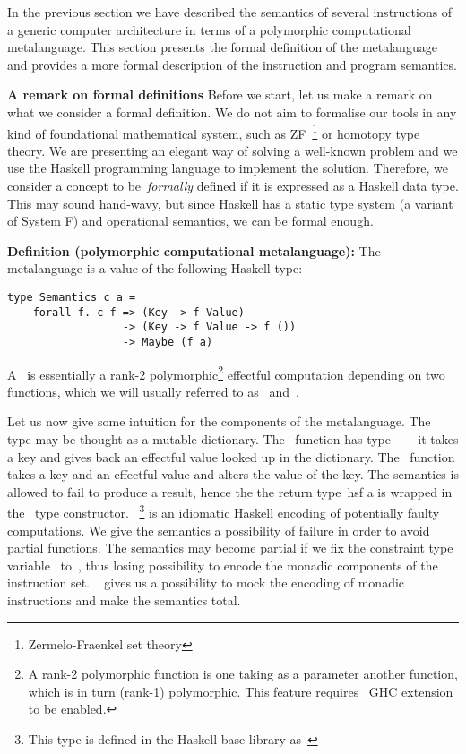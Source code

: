 
In the previous section we have described the semantics of several instructions of
a generic computer architecture in terms of a polymorphic computational metalanguage.
This section presents the formal definition of the metalanguage and provides a more
formal description of the instruction and program semantics.

\textbf{A remark on formal definitions}
Before we start, let us make a remark on what we consider a formal definition.
We do not aim to formalise our tools in any kind of foundational mathematical system,
such as ZF~\footnote{Zermelo-Fraenkel set theory} or homotopy type theory. We are
presenting an elegant way of solving a well-known problem and we use the Haskell
programming language to implement the solution. Therefore, we consider a concept
to be~\emph{formally} defined if it is expressed as a Haskell data type. This may
sound hand-wavy, but since Haskell has a static type system (a variant of System F)
and operational semantics, we can be formal enough.

\textbf{Definition (polymorphic computational metalanguage):\label{def:metalanguage}}
The metalanguage is a value of the following Haskell type:

\begin{verbatim}
type Semantics c a =
    forall f. c f => (Key -> f Value)
                  -> (Key -> f Value -> f ())
                  -> Maybe (f a)
\end{verbatim}

\noindent A~ is essentially a rank-2 polymorphic\footnote{A rank-2 polymorphic
function is one taking as a parameter another function, which is in turn (rank-1)
polymorphic. This feature requires~ GHC extension to be enabled.}
effectful computation depending on two functions,
which we will usually referred to as~ and~.

Let us now give some intuition for the components of the metalanguage.
The~
type may be thought as a mutable dictionary. The~ function has
type~ --- it takes
a key and gives back an effectful value looked up in the dictionary. The~
function takes a key and an effectful value and alters the value of the key.
The semantics is allowed to fail to produce a result, hence the
the return type~hs{f a} is wrapped in the~ type constructor.~
\footnote{This type is defined in the Haskell base library as~}
is an idiomatic Haskell encoding of potentially faulty computations. We give the
semantics a possibility of failure in order to avoid partial functions. The semantics
may become partial if we fix the constraint type variable~ to~,
thus losing possibility to encode the monadic components of the instruction set.
~ gives us a possibility to mock the encoding of monadic instructions
and make the semantics total.


